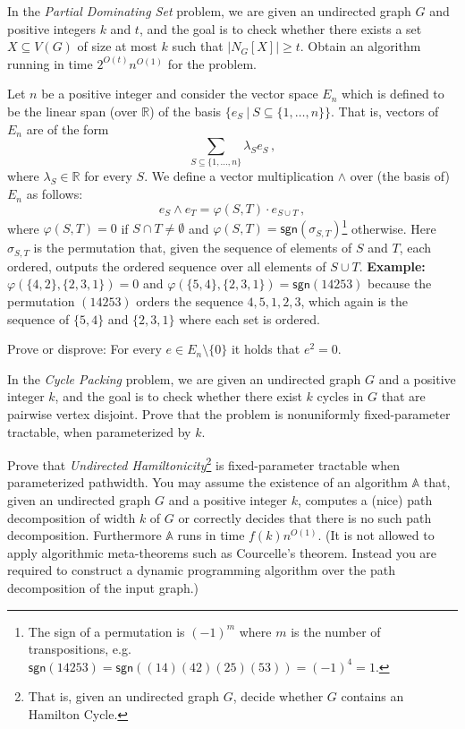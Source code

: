 \documentclass{uebung_cs}
\begin{document}
\begin{exercise}
In the \emph{Partial Dominating Set} problem, we are given an undirected graph $G$ and positive integers $k$ and $t$, and the goal is to check whether there exists a set $X\subseteq V(G)$ of size at most $k$ such that $|N_G[X]| \geq t$. Obtain an algorithm running in time $2^{O(t)}n^{O(1)}$ for the problem.
\end{exercise}

\begin{exercise}
Let $n$ be a positive integer and consider the vector space $E_n$ which is defined to be the linear span (over $\mathbb{R}$) of the basis $\{e_S ~|~S \subseteq \{1,\dots,n\}\}$. That is, vectors of $E_n$ are of the form
\[ \sum_{S \subseteq \{1,\dots,n\}} \lambda_S e_S \,,\]
where $\lambda_S \in \mathbb{R}$ for every $S$. We define a vector multiplication $\wedge$ over (the basis of) $E_n$ as follows:
\[e_S \wedge e_T = \varphi(S,T)\cdot e_{S \cup T} \,,\]
where $\varphi(S,T)= 0$ if $S \cap T \neq \emptyset$ and $\varphi(S,T)=\mathsf{sgn}(\sigma_{S,T})$\footnote{The sign of a permutation is $(-1)^m$ where $m$ is the number of transpositions, e.g. $\mathsf{sgn}(14253)= \mathsf{sgn}((14)(42)(25)(53)) = (-1)^4 = 1$. } otherwise. Here $\sigma_{S,T}$ is the permutation that, given the sequence of elements of $S$ and $T$, each ordered, outputs the ordered sequence over all elements of $S\cup T$. \textbf{Example:} $\varphi(\{4,2\},\{2,3,1\})= 0$ and $\varphi(\{5,4\},\{2,3,1\}) = \mathsf{sgn}(14253)$ because the permutation $(14253)$ orders the sequence $4,5,1,2,3$, which again is the sequence of $\{5,4\}$ and $\{2,3,1\}$ where each set is ordered.

Prove or disprove: For every $e \in E_n\setminus \{0\}$ it holds that $e^2 = 0$.
\end{exercise}

\begin{exercise}
In the \emph{Cycle Packing} problem, we are given an undirected graph $G$ and a positive integer $k$, and the goal is to check whether there exist $k$ cycles in $G$ that are pairwise vertex disjoint. Prove that the problem is nonuniformly fixed-parameter tractable, when parameterized by $k$.
\end{exercise}

\begin{exercise}
Prove that \emph{Undirected Hamiltonicity}\footnote{That is, given an undirected graph $G$, decide whether $G$ contains an Hamilton Cycle.} is fixed-parameter tractable when parameterized pathwidth. You may assume the existence of an algorithm $\mathbb{A}$ that, given an undirected graph $G$ and a positive integer $k$, computes a (nice) path decomposition of width $k$ of $G$ or correctly decides that there is no such path decomposition. Furthermore $\mathbb{A}$ runs in time $f(k) n^{O(1)}$. (It is not allowed to apply algorithmic meta-theorems such as Courcelle's theorem. Instead you are required to construct a dynamic programming algorithm over the path decomposition of the input graph.)
\end{exercise}
\end{document}

